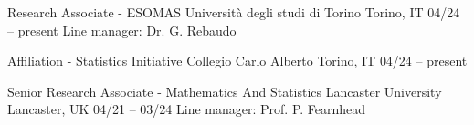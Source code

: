 


\begin{cventries}

  \cventry
    {Research Associate - ESOMAS}
    {Università degli studi di Torino}
    {Torino, IT}
    {04\slash 24 -- present}
    {Line manager: Dr. G. Rebaudo}
    
  \cventry
    {Affiliation - Statistics Initiative}
    {Collegio Carlo Alberto}
    {Torino, IT}
    {04\slash 24 -- present}
    {}
    
  \cventry
    {Senior Research Associate - Mathematics And Statistics}
    {Lancaster University}
    {Lancaster, UK}
    {04\slash 21 -- 03\slash 24}
    {Line manager: Prof. P. Fearnhead}

\end{cventries}
